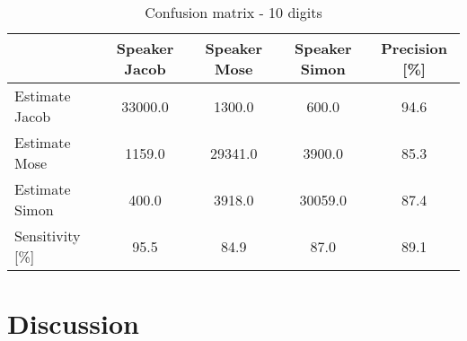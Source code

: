 \begin{table}[H]                          
\centering                                                     
\begin{tabular}{|l|c|c|c|c|}                                   
\hline                                                         
  & Speaker Jacob & Speaker Mose & Speaker Simon & Precision [\%] \\
\hline                                                         
Estimate Jacob & 33000.0 & 1300.0 & 600.0 & 94.6 \\            
\hline                                                         
Estimate Mose & 1159.0 & 29341.0 & 3900.0 & 85.3 \\            
\hline                                                         
Estimate Simon & 400.0 & 3918.0 & 30059.0 & 87.4 \\            
\hline                                                         
Sensitivity [\%] & 95.5 & 84.9 & 87.0 & 89.1 \\                
\hline                                                         
\end{tabular}                                                  
\caption{Confusion matrix - 10 digits}                         
\label{table:GMM_conf_10}                                      
\end{table}

\section{Discussion}














